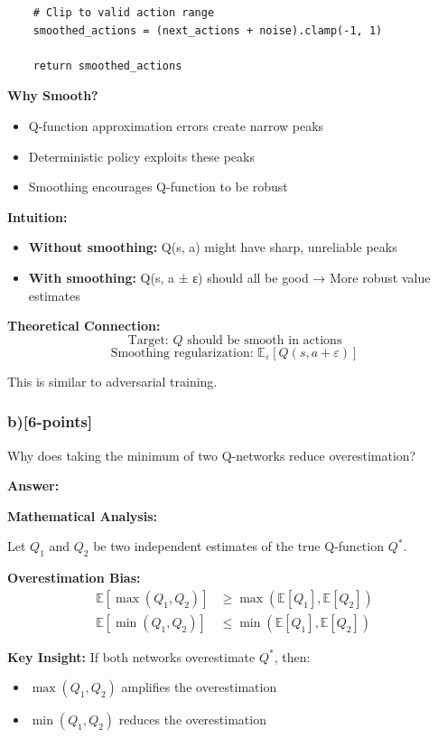 \documentclass[12pt]{article}
\begin{document}
{{\begin{verbatim}
    # Clip to valid action range
    smoothed_actions = (next_actions + noise).clamp(-1, 1)
    
    return smoothed_actions
\end{verbatim}

\textbf{Why Smooth?}
\begin{itemize}
\item Q-function approximation errors create narrow peaks
\item Deterministic policy exploits these peaks
\item Smoothing encourages Q-function to be robust
\end{itemize}

\textbf{Intuition:}
\begin{itemize}
\item \textbf{Without smoothing:} Q(s, a) might have sharp, unreliable peaks
\item \textbf{With smoothing:} Q(s, a ± ε) should all be good → More robust value estimates
\end{itemize}

\textbf{Theoretical Connection:}
\begin{equation}
\text{Target: } Q \text{ should be smooth in actions}
\end{equation}
\begin{equation}
\text{Smoothing regularization: } \mathbb{E}_\varepsilon[Q(s, a + \varepsilon)]
\end{equation}

This is similar to adversarial training.

\subsubsection{b)[6-points]} Why does taking the minimum of two Q-networks reduce overestimation?

\textbf{Answer:}

\textbf{Mathematical Analysis:}

Let $Q_1$ and $Q_2$ be two independent estimates of the true Q-function $Q^*$.

\textbf{Overestimation Bias:}
\begin{align}
\mathbb{E}[\max(Q_1, Q_2)] &\geq \max(\mathbb{E}[Q_1], \mathbb{E}[Q_2]) \\
\mathbb{E}[\min(Q_1, Q_2)] &\leq \min(\mathbb{E}[Q_1], \mathbb{E}[Q_2])
\end{align}

\textbf{Key Insight:} If both networks overestimate $Q^*$, then:
\begin{itemize}
\item $\max(Q_1, Q_2)$ amplifies the overestimation
\item $\min(Q_1, Q_2)$ reduces the overestimation
\end{itemize}

}}
\end{document}
